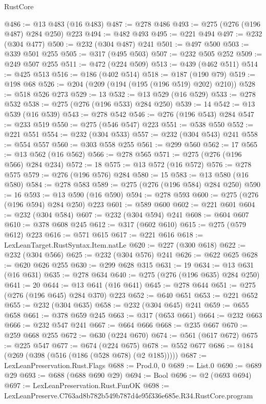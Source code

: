 \begin{lexlean}{RustCore}
\begin{coremodule}
@486 := @13 @483 (@16 @483)
@487 := @278 @486
@493 := @275 (@276 (@196 @487) @284 @250) @223
@494 := @482 @493
@495 := @221 @494
@497 := @232 (@304 @477)
@500 := @232 (@304 @487) @241
@501 := @497 @500
@503 := @339 @501 @255
@505 := @317 (@495 @503)
@507 := @232 @505 @252
@509 := @249 @507 @255
@511 := @472 (@224 @509)
@513 := @439 (@462 @511)
@514 := @425 @513
@516 := @186 (@402 @514)
@518 := @187 (@190 @79)
@519 := @198 @68
@526 := @204 (@209 (@194 (@195 (@196 @519) @202) @210))
@528 := @518 @526 @273
@529 := 13
@532 := @13 @529 (@16 @529)
@533 := @278 @532
@538 := @275 (@276 (@196 @533) @284 @250)
@539 := 14
@542 := @13 @539 (@16 @539)
@543 := @278 @542
@546 := @276 (@196 @543) @284
@547 := @233 @519
@550 := @275 (@546 @547) @223
@551 := @538 @550
@552 := @221 @551
@554 := @232 (@304 @533)
@557 := @232 (@304 @543) @241
@558 := @554 @557
@560 := @303 @558 @255
@561 := @299 @560
@562 := 17
@565 := @13 @562 (@16 @562)
@566 := @278 @565
@571 := @275 (@276 (@196 @566) @284 @234)
@572 := 18
@575 := @13 @572 (@16 @572)
@576 := @278 @575
@579 := @276 (@196 @576) @284
@580 := 15
@583 := @13 @580 (@16 @580)
@584 := @278 @583
@589 := @275 (@276 (@196 @584) @284 @250)
@590 := 16
@593 := @13 @590 (@16 @590)
@594 := @278 @593
@600 := @275 (@276 (@196 @594) @284 @250) @223
@601 := @589 @600
@602 := @221 @601
@604 := @232 (@304 @584)
@607 := @232 (@304 @594) @241
@608 := @604 @607
@610 := @378 @608 @245
@612 := @317 (@602 @610)
@615 := @275 (@579 @612) @223
@616 := @571 @615
@617 := @221 @616
@618 := LexLeanTarget.RustSyntax.Item.natLe
@620 := @227 (@300 @618)
@622 := @232 (@304 @566)
@625 := @232 (@304 @576) @241
@626 := @622 @625
@628 := @620 @626 @255
@630 := @299 @628 @315
@631 := 19
@634 := @13 @631 (@16 @631)
@635 := @278 @634
@640 := @275 (@276 (@196 @635) @284 @250)
@641 := 20
@644 := @13 @641 (@16 @641)
@645 := @278 @644
@651 := @275 (@276 (@196 @645) @284 @370) @223
@652 := @640 @651
@653 := @221 @652
@655 := @232 (@304 @635)
@658 := @232 (@304 @645) @241
@659 := @655 @658
@661 := @378 @659 @245
@663 := @317 (@653 @661)
@664 := @232 @663
@666 := @232 @547 @241
@667 := @664 @666
@668 := @235 @667
@670 := @259 @668 @255
@672 := @630 (@224 @670)
@674 := @561 (@617 @672)
@675 := @225 @547
@677 := @674 (@224 @675)
@678 := @552 @677
@686 := @184 (@269 (@398 (@516 (@186 (@528 @678) (@2 @185)))))
@687 := LexLeanPreservation.Rust.Flags
@688 := Prod.{0, 0}
@689 := List.{0}
@690 := @689 @29
@693 := @688 (@688 @690 @29)
@694 := Bool
@696 := @2 (@693 @694)
@697 := LexLeanPreservation.Rust.FunOK
@698 := LexLeanPreserve.C763ad8b782b549b787d4e95f336e685e.R34.RustCore.program

\end{coremodule}
\end{lexlean}
